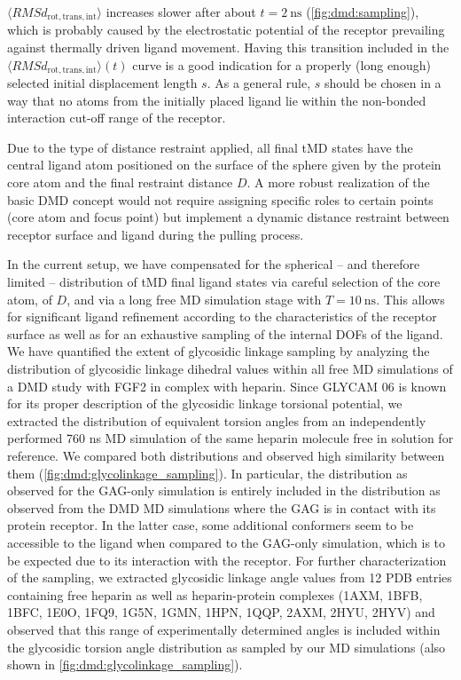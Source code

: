 $\langle RMSd_{\mathrm{rot,trans,int}}\rangle$ increases slower after about
$t=\SI{2}{\nano\second}$ (\cref{fig:dmd:sampling}), which is probably caused by
the electrostatic potential of the receptor prevailing against thermally driven
ligand movement. Having this transition included in the $\langle
RMSd_{\mathrm{rot,trans,int}}\rangle(t)$ curve is a good indication for a
properly (long enough) selected initial displacement length $s$. As a general
rule, $s$ should be chosen in a way that no atoms from the initially placed
ligand lie within the non-bonded interaction cut-off range of the receptor.

Due to the type of distance restraint applied, all final tMD states have the
central ligand atom positioned on the surface of the sphere given by the protein
core atom and the final restraint distance $D$. A more robust realization of the
basic DMD concept would not require assigning specific roles to certain points
(core atom and focus point) but implement a dynamic distance restraint between
receptor surface and ligand during the pulling process.

In the current setup, we have compensated for the spherical – and therefore
limited – distribution of tMD final ligand states via careful selection of the
core atom, of $D$, and via a long free MD simulation stage with
$T=\SI{10}{\nano\second}$. This allows for significant ligand refinement
according to the characteristics of the receptor surface as well as for an
exhaustive sampling of the internal DOFs of the ligand. We have quantified the
extent of glycosidic linkage sampling by analyzing the distribution of
glycosidic linkage dihedral values within all free MD simulations of a DMD study
with FGF2 in complex with heparin. Since GLYCAM 06 is known for its proper
description of the glycosidic linkage torsional
potential{\cite{kirschner_glycam06:_2008}}, we extracted the distribution of
equivalent torsion angles from an independently performed 760 ns MD simulation
of the same heparin molecule free in solution for reference. We compared both
distributions and observed high similarity between them
(\cref{fig:dmd:glycolinkage_sampling}). In particular, the distribution as
observed for the GAG-only simulation is entirely included in the distribution as
observed from the DMD MD simulations where the GAG is in contact with its
protein receptor. In the latter case, some additional conformers seem to be
accessible to the ligand when compared to the GAG-only simulation, which is to
be expected due to its interaction with the receptor. For further
characterization of the sampling, we extracted glycosidic linkage angle values
from 12 PDB entries containing free heparin as well as heparin-protein complexes
(1AXM, 1BFB, 1BFC, 1E0O, 1FQ9, 1G5N, 1GMN, 1HPN, 1QQP, 2AXM, 2HYU, 2HYV) and
observed that this range of experimentally determined angles is included within
the glycosidic torsion angle distribution as sampled by our MD simulations (also
shown in \cref{fig:dmd:glycolinkage_sampling}).


